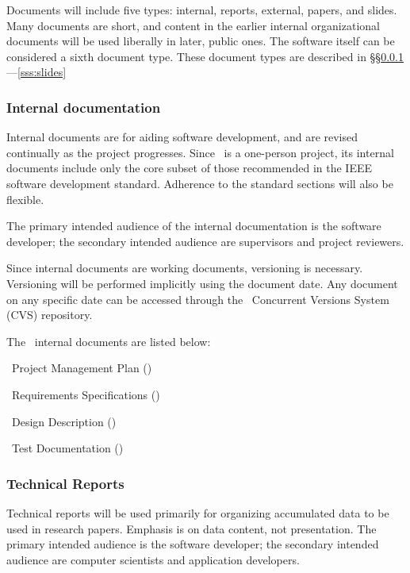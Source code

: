 \documentclass[11pt]{article}
\begin{document}
Documents will include five types: internal, reports, external, papers, and
slides.  Many documents are short, and content in the earlier internal
organizational documents will be used liberally in later, public ones.
The software itself can be considered a sixth document type.  These
document types are described in
\S\S\ref{sss:internal}---\ref{sss:slides}


\subsubsection{Internal documentation} \label{sss:internal}

Internal documents are for aiding software development, and are
revised continually as the project progresses.  Since \amrSolve\ is a
one-person project, its internal documents include only the core
subset of those recommended in the IEEE software development standard.
Adherence to the standard sections will also be flexible.

The primary intended audience of the internal documentation is the
software developer; the secondary intended audience are supervisors and
project reviewers.

Since internal documents are working documents, versioning is
necessary.  Versioning will be performed implicitly using the document
date.  Any document on any specific date can be accessed through the
\amrSolve\ Concurrent Versions System (CVS) repository.  

The \amrSolve\ internal documents are listed below:

\BeginENUMERATE
  \item  \amrSolve\ Project Management Plan ()
  \item  \amrSolve\ Requirements Specifications ()
  \item  \amrSolve\ Design Description ()
  \item  \amrSolve\ Test Documentation ()
\EndENUMERATE


\subsubsection{Technical Reports}

Technical reports will be used primarily for organizing accumulated
data to be used in research papers.  Emphasis is on data content, not
presentation.  The primary intended audience is the software
developer; the secondary intended audience are computer scientists and
application developers.
\end{document}

